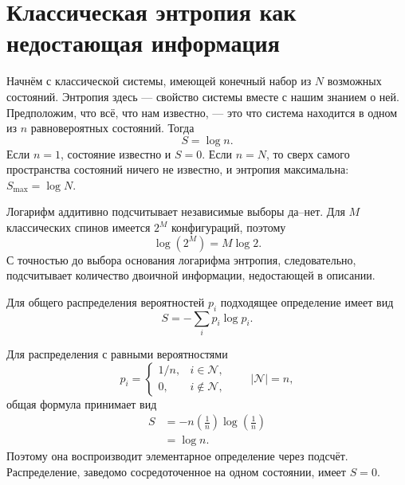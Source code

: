 \section{Классическая энтропия как недостающая информация}

Начнём с классической системы, имеющей конечный набор из \(N\) возможных состояний. Энтропия здесь — свойство системы вместе с нашим знанием о ней. Предположим, что всё, что нам известно, — это что система находится в одном из \(n\) равновероятных состояний. Тогда
\begin{equation}
S=\log n.
\end{equation}
Если \(n=1\), состояние известно и \(S=0\). Если \(n=N\), то сверх самого пространства состояний ничего не известно, и энтропия максимальна: \(S_{\max}=\log N\).

Логарифм аддитивно подсчитывает независимые выборы да--нет. Для \(M\) классических спинов имеется \(2^M\) конфигураций, поэтому
\begin{equation}
\log(2^M)=M\log 2.
\end{equation}
С точностью до выбора основания логарифма энтропия, следовательно, подсчитывает количество двоичной информации, недостающей в описании.

Для общего распределения вероятностей \(p_i\) подходящее определение имеет вид
\begin{equation}
S=-\sum_i p_i\log p_i.
\end{equation}

\begin{classroomqa}
\end{classroomqa}

Для распределения с равными вероятностями
\begin{equation}
p_i=
\begin{cases}
1/n, & i\in\mathcal N,\\
0, & i\notin\mathcal N,
\end{cases}
\qquad |\mathcal N|=n,
\end{equation}
общая формула принимает вид
\begin{align}
S
&=-n\left(\frac1n\right)\log\left(\frac1n\right)\\
&=\log n.
\end{align}
Поэтому она воспроизводит элементарное определение через подсчёт. Распределение, заведомо сосредоточенное на одном состоянии, имеет \(S=0\).

